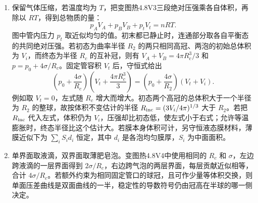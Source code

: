 \documentclass[UTF8,fontset=fandol,a4paper,11pt]{ctexart}
\newcommand{\figcaption}[1]{\par\vspace{2pt}{\small\color{muted}#1}\par}
\begin{document}
\begin{enumerate}
\item 保留气体压缩，若温度均为 $T$，把变图热4.8V3三段绝对压强乘各自体积，再除以 $RT$，得到总物质的量：
\[
p_AV_A+p_BV_B+p_tV_t=nRT.
\]
图中管内压力 $p_t$ 取近似均匀的值。初末都已静止时，连通部分取各自平衡态的共同绝对压强。若初态为曲率半径 $R_2$ 的两只相同高冠、两泡的初始总体积为 $V_i$，而终态为半径 $R_c$ 的互补冠，则有 $V_A+V_B=4\pi R_c^3/3$ 和 $p=p_0+4\sigma/R_c$。固定管容积 $V_t$ 后，守恒式给出
\[
\left(p_0+\frac{4\sigma}{R_c}\right)\left(V_t+\frac{4\pi R_c^3}{3}\right)
=\left(p_0+\frac{4\sigma}{R_2}\right)(V_t+V_i).
\]
例如取 $V_t=0$，左式随 $R_c$ 增大而增大。初态两个高冠的总体积大于一个半径为 $R_2$ 的整球，故按体积不变估计的半径 $R_{\rm inc}=(3V_i/4\pi)^{1/3}$ 大于 $R_2$。若把 $R_{\rm inc}$ 代入左式，体积仍为 $V_i$，压强却比初态低，使左式小于右式；允许等温膨胀时，终态半径比这个估计大。若膜本身体积可计，另守恒液态膜材料，薄膜近似下为 $\sum_i S_i d_i$ 恒定，其中 $d_i$ 是各泡均匀膜厚，$S_i$ 为中面面积。
\begin{center}\begin{minipage}{.98\linewidth}\centering
{}
\figcaption{变图热4.8V3\quad 两泡与连通管内的气体物质的量一并守恒}
\end{minipage}\end{center}
\item 单界面取液滴，双界面取薄肥皂泡。变图热4.8V4中使用相同的 $R_c$ 和 $\sigma$，左边跨液滴的一层界面得到 $2\sigma/R_c$，右边跨气泡的两层界面，每层贡献近似相等，合计 $4\sigma/R_c$。若额外约束为相同固定管口的球冠，且可作少量等体积交换，则单面压差曲线是双面曲线的一半，稳定性的导数符号仍由冠高在半球的哪一侧决定。
\begin{center}\begin{minipage}{.98\linewidth}\centering
{}
\end{minipage}
\end{center}
\end{enumerate}
\end{document}
